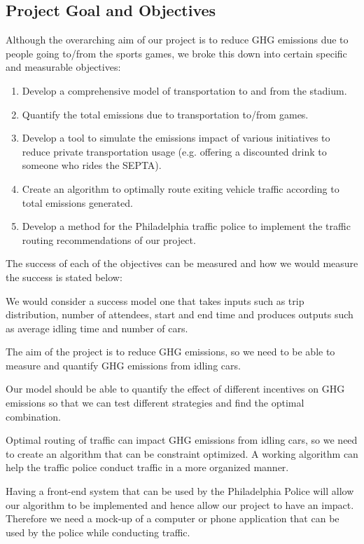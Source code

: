 \subsection{Project Goal and Objectives}
Although the overarching aim of our project is to reduce GHG
emissions due to people going to/from the sports games, we broke this
down into certain specific and measurable objectives:

\begin{enumerate}
    \item Develop a comprehensive model of transportation to and from
  the stadium.
    \item Quantify the total emissions due to transportation to/from
  games.
    \item Develop a tool to simulate the emissions impact of various
  initiatives to reduce private transportation usage (e.g. offering a
  discounted drink to someone who rides the SEPTA).
    \item Create an algorithm to optimally route exiting vehicle traffic
  according to total emissions generated.
    \item Develop a method for the Philadelphia traffic police to
  implement the traffic routing recommendations of our project.
\end{enumerate}

The success of each of the objectives can be measured and how we would
measure the success is stated below:

We would consider a success model one that takes inputs such as trip
distribution, number of attendees, start and end time and produces
outputs such as average idling time and number of cars.

The aim of the project is to reduce GHG emissions, so we need to be
able to measure and quantify GHG emissions from idling cars.

Our model should be able to quantify the effect of different
incentives on GHG emissions so that we can test different
strategies and find the optimal combination.

Optimal routing of traffic can impact GHG emissions from idling
cars, so we need to create an algorithm that can be constraint
optimized. A working algorithm can help the traffic police conduct
traffic in a more organized manner.

Having a front-end system that can be used by the Philadelphia Police
will allow our algorithm to be implemented and hence allow our project
to have an impact. Therefore we need a mock-up of a computer or phone application
that can be used by the police while conducting traffic.


